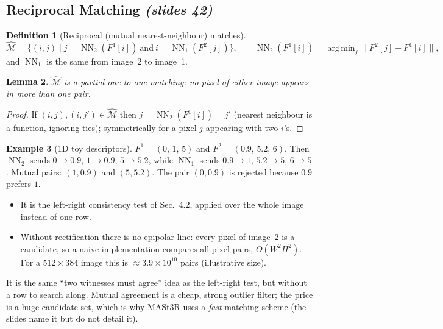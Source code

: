 \documentclass[11pt,a4paper]{article}
\newcommand{\slr}[1]{\texorpdfstring{\emph{(slides #1)}}{(slides #1)}}
\DeclareMathOperator{\NN}{NN}
\DeclareMathOperator*{\argmin}{arg\,min}
\theoremstyle{definition}
\newtheorem{definition}{Definition}[section]
\newtheorem{example}[definition]{Example}
\theoremstyle{plain}
\newtheorem{lemma}[definition]{Lemma}
\theoremstyle{remark}
\begin{document}
\subsection{Reciprocal Matching \slr{42}}
\begin{definition}[Reciprocal (mutual nearest-neighbour) matches]
\[ \hat{\mathcal M}=\bigl\{(i,j)\mid j=\NN_2(F^1[i])\ \text{and}\ i=\NN_1(F^2[j])\bigr\},\qquad \NN_2(F^1[i])=\argmin_j\lVert F^2[j]-F^1[i]\rVert, \]
and $\NN_1$ is the same from image~2 to image~1.
\end{definition}
\begin{lemma}
$\hat{\mathcal M}$ is a partial one-to-one matching: no pixel of either image appears in more than one pair.
\end{lemma}
\begin{proof}
If $(i,j),(i,j')\in\hat{\mathcal M}$ then $j=\NN_2(F^1[i])=j'$ (nearest neighbour is a function, ignoring ties); symmetrically for a pixel $j$ appearing with two $i$'s.
\end{proof}
\begin{example}[1D toy descriptors]
$F^1=(0,\,1,\,5)$ and $F^2=(0.9,\,5.2,\,6)$. Then $\NN_2$ sends $0\to0.9$, $1\to0.9$, $5\to5.2$, while $\NN_1$ sends $0.9\to1$, $5.2\to5$, $6\to5$. Mutual pairs: $(1,0.9)$ and $(5,5.2)$. The pair $(0,0.9)$ is rejected because $0.9$ prefers $1$.
\end{example}
\begin{itemize}
\item It is the left-right consistency test of Sec.~4.2, applied over the whole image instead of one row.
\item Without rectification there is no epipolar line: every pixel of image~2 is a candidate, so a naive implementation compares all pixel pairs, $O(W^2H^2)$. For a $512\times384$ image this is $\approx3.9\times10^{10}$ pairs (illustrative size).
\end{itemize}
\begin{intuition}
It is the same ``two witnesses must agree'' idea as the left-right test, but without a row to search along. Mutual agreement is a cheap, strong outlier filter; the price is a huge candidate set, which is why MASt3R uses a \emph{fast} matching scheme (the slides name it but do not detail it).
\end{intuition}
\end{document}
